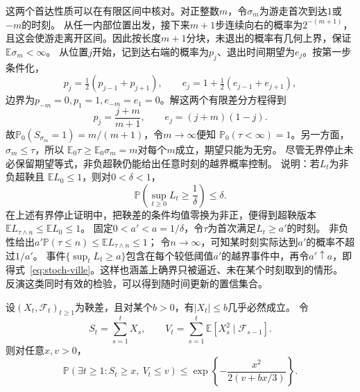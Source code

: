 这两个首达性质可以在有限区间中核对。对正整数\(m\)，令\(\sigma_m\)为游走首次到达\(1\)或\(-m\)的时刻。
从任一内部位置出发，接下来\(m+1\)步连续向右的概率为\(2^{-(m+1)}\)，且这会使游走离开区间。因此按长度\(m+1\)分块，未退出的概率有几何上界，保证\(\mathbb E\sigma_m<\infty\)。
从位置\(j\)开始，记到达右端的概率为\(p_j\)、退出时间期望为\(e_j\)。按第一步条件化，
\[
 p_j=\tfrac12(p_{j-1}+p_{j+1}),\qquad
 e_j=1+\tfrac12(e_{j-1}+e_{j+1}),
\]
边界为\(p_{-m}=0,p_1=1,e_{-m}=e_1=0\)。解这两个有限差分方程得到
\[
 p_j=\frac{j+m}{m+1},\qquad e_j=(j+m)(1-j).
\]
故\(\mathbb P_0(S_{\sigma_m}=1)=m/(m+1)\)，令\(m\to\infty\)便知
\(\mathbb P_0(\tau<\infty)=1\)。另一方面，\(\sigma_m\leq\tau\)，所以
\(\mathbb E_0\tau\geq\mathbb E_0\sigma_m=m\)对每个\(m\)成立，期望只能为无穷。
尽管无界停止未必保留期望等式，非负超鞅仍能给出任意时刻的越界概率控制。
说明：若$L_t$为非负超鞅且
$\mathbb{E}L_0\leq1$，则对\(0<\delta<1\)，
\begin{equation}
  \mathbb{P}\left(\sup_{t\geq0}L_t\geq\frac1\delta\right)
  \leq\delta.
  \label{eq:stoch-ville}
\end{equation}
在上述有界停止证明中，把鞅差的条件均值零换为非正，便得到超鞅版本
\(\mathbb E L_{\tau\wedge n}\leq\mathbb E L_0\leq1\)。
固定\(0<a'<a=1/\delta\)，令\(\tau\)为首次满足\(L_t\geq a'\)的时刻。
非负性给出\(a'\mathbb P(\tau\leq n)\leq\mathbb E L_{\tau\wedge n}\leq1\)；
令\(n\to\infty\)，可知某时刻实际达到\(a'\)的概率不超过\(1/a'\)。
事件\(\{\sup_tL_t\geq a\}\)包含在每个较低阈值\(a'\)的越界事件中，再令\(a'\uparrow a\)，即得式~\eqref{eq:stoch-ville}。这样也涵盖上确界只被逼近、未在某个时刻取到的情形。
反演这类同时有效的检验，可以得到随时间更新的置信集合。
\begin{theorem}[标量Freedman不等式]
  \label{thm:stoch-freedman}
  设$(X_t,\mathcal{F}_t)_{t\geq1}$为鞅差，且对某个$b>0$，有$|X_t|\leq b$几乎必然成立。
  令
  \[
    S_t=\sum_{s=1}^{t}X_s,\qquad
    V_t=\sum_{s=1}^{t}
      \mathbb{E}[X_s^2\mid\mathcal{F}_{s-1}].
  \]
  则对任意$x,v>0$，
  \begin{equation}
    \mathbb{P}\left(\exists t\geq1:S_t\geq x,\ V_t\leq v\right)
    \leq\exp\left\{
      -\frac{x^2}{2(v+bx/3)}
    \right\}.
    \label{eq:stoch-freedman}
  \end{equation}
\end{theorem}

